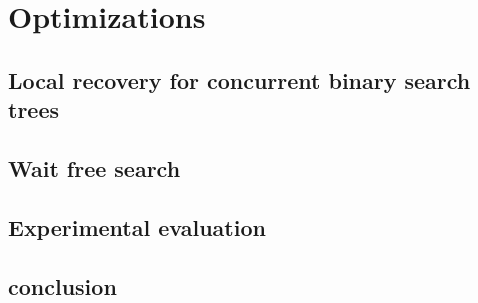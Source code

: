 \documentclass[doublespacing]{utdthesis}
\begin{document}
\part{Optimizations}

\chapter{Local recovery for concurrent binary search trees}
\label{chapter:localRecovery}


\chapter{Wait free search}
\label{chapter:waitFreeSearch}


\chapter{Experimental evaluation}
\label{chapter:experiments}


\chapter{conclusion}
\label{chapter:conclusion}


\begin{thesisbib}

\end{thesisbib}

\begin{vita}

\end{vita}
\end{document}
